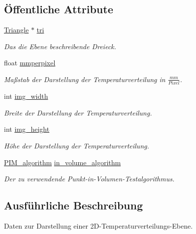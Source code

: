 \subsection*{Öffentliche Attribute}
\begin{DoxyCompactItemize}
\item 
\hyperlink{classTriangle}{Triangle} $\ast$ \hyperlink{structUtils_1_1CutRender__info_a2998343c733073b317fdd04bd341ce1f}{tri}
\begin{DoxyCompactList}\small\item\em Das die Ebene beschreibende Dreieck. \end{DoxyCompactList}\item 
float \hyperlink{structUtils_1_1CutRender__info_aca49d9537a774906b88f3fd7059d2dcb}{mmperpixel}
\begin{DoxyCompactList}\small\item\em Maßstab der Darstellung der Temperaturverteilung in $\frac{mm}{Pixel}$. \end{DoxyCompactList}\item 
int \hyperlink{structUtils_1_1CutRender__info_ac7a1e2c64129630affaf208808a190eb}{img\-\_\-width}
\begin{DoxyCompactList}\small\item\em Breite der Darstellung der Temperaturverteilung. \end{DoxyCompactList}\item 
int \hyperlink{structUtils_1_1CutRender__info_abac1c3e4edb7183017ecfa7b69c40d25}{img\-\_\-height}
\begin{DoxyCompactList}\small\item\em Höhe der Darstellung der Temperaturverteilung. \end{DoxyCompactList}\item 
\hyperlink{namespaceUtils_ad369b0127cabda0d6871ce1ae7e6c862}{P\-I\-M\-\_\-algorithm} \hyperlink{structUtils_1_1CutRender__info_af2ee1118ac14a73a2a350a05102013ab}{in\-\_\-volume\-\_\-algorithm}
\begin{DoxyCompactList}\small\item\em Der zu verwendende Punkt-\/in-\/\-Volumen-\/\-Testalgorithmus. \end{DoxyCompactList}\end{DoxyCompactItemize}


\subsection{Ausführliche Beschreibung}
Daten zur Darstellung einer 2\-D-\/\-Temperaturverteilungs-\/\-Ebene. 

